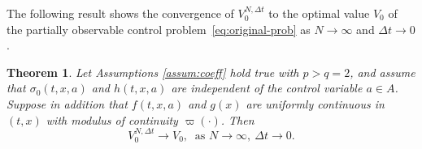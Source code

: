 \documentclass[11pt]{article}
\numberwithin{equation}{section}
\theoremstyle{plain}
\newtheorem{theorem}{Theorem}[section]
\theoremstyle{definition}
\theoremstyle{remark}
\begin{document}
	The following result shows the convergence of $V_0^{N,\Delta t}$ to the optimal value $V_0$ of the partially observable control problem~\eqref{eq:original-prob} 
	as $N \longrightarrow \infty$ and $\Delta t \longrightarrow 0$. 
	\begin{theorem} \label{thm:cvg_discrete}
		Let Assumptions \ref{assum:coeff} hold true with $p > q = 2$, 
		and assume that $\sigma_0(t,x,a)$ and $h(t,x,a)$ are independent of the control variable $a \in A$.
		Suppose in addition that $f(t,x,a)$ and $g(x)$ are uniformly continuous in $(t,x)$ with modulus of continuity $\varpi(\cdot)$.
		Then
		\begin{equation*}
			V_0^{N, \Delta t} \longrightarrow V_0,  ~\text{ as }N\longrightarrow \infty,~ \Delta t \longrightarrow 0. 
		\end{equation*}
	\end{theorem}
\end{document}
